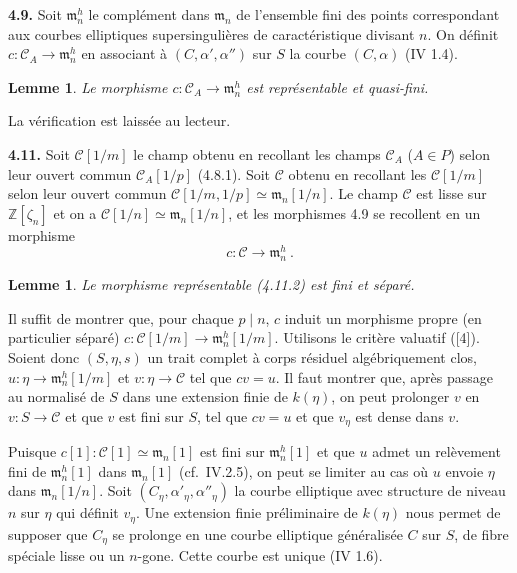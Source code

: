 \documentclass[10pt,a4paper]{amsart}
\theoremstyle{plain}
\newtheorem{lemma}[theorem]{Lemme}
\theoremstyle{definition}
\newcommand{\m}{\mathfrak{m}}
\newcommand{\cC}{\mathcal{C}}
\newcommand{\ZZ}{\mathbb{Z}}
\begin{document}
\medskip\noindent\textbf{4.9.} Soit $\m_n^h$ le compl\'ement dans $\m_n$ de l'ensemble fini des points correspondant aux courbes elliptiques supersinguli\`eres de caract\'eristique divisant $n$. On d\'efinit $c : \cC_A \to \m_n^h$ en associant \`a $(C, \alpha', \alpha'')$ sur $S$ la courbe $(C, \alpha)$ (IV 1.4).

\setcounter{theorem}{9}
\begin{lemma}
Le morphisme $c : \cC_A \to \m_n^h$ est repr\'esentable et quasi-fini.
\end{lemma}

La v\'erification est laiss\'ee au lecteur.

\medskip\noindent\textbf{4.11.} Soit $\cC[1/m]$ le champ obtenu en recollant les champs $\cC_A$ ($A \in P$) selon leur ouvert commun $\cC_A[1/p]$ (4.8.1). Soit $\cC$ obtenu en recollant les $\cC[1/m]$ selon leur ouvert commun $\cC[1/m, 1/p] \simeq \m_n[1/n]$. Le champ $\cC$ est lisse sur $\ZZ[\zeta_n]$ et on a $\cC[1/n] \simeq \m_n[1/n]$, et les morphismes 4.9 se recollent en un morphisme
\begin{equation}
c : \cC \to \m_n^h\ .
\end{equation}

\setcounter{theorem}{2}
\begin{lemma}
Le morphisme repr\'esentable (4.11.2) est fini et s\'epar\'e.
\end{lemma}

Il suffit de montrer que, pour chaque $p \mid n$, $c$ induit un morphisme propre (en particulier s\'epar\'e) $c : \cC[1/m] \to \m_n^h[1/m]$. Utilisons le crit\`ere valuatif ([4]). Soient donc $(S, \eta, s)$ un trait complet \`a corps r\'esiduel alg\'ebriquement clos, $u : \eta \to \m_n^h[1/m]$ et $v : \eta \to \cC$ tel que $cv = u$. Il faut montrer que, apr\`es passage au normalis\'e de $S$ dans une extension finie de $k(\eta)$, on peut prolonger $v$ en $v : S \to \cC$ et que $v$ est fini sur $S$, tel que $cv = u$ et que $v_\eta$ est dense dans $v$.

Puisque $c[1] : \cC[1] \simeq \m_n[1]$ est fini sur $\m_n^h[1]$ et que $u$ admet un rel\`evement fini de $\m_n^h[1]$ dans $\m_n[1]$ (cf.\ IV.2.5), on peut se limiter au cas o\`u $u$ envoie $\eta$ dans $\m_n[1/n]$. Soit $(C_\eta, \alpha'_\eta, \alpha''_\eta)$ la courbe elliptique avec structure de niveau $n$ sur $\eta$ qui d\'efinit $v_\eta$. Une extension finie pr\'eliminaire de $k(\eta)$ nous permet de supposer que $C_\eta$ se prolonge en une courbe elliptique g\'en\'eralis\'ee $C$ sur $S$, de fibre sp\'eciale lisse ou un $n$-gone. Cette courbe est unique (IV 1.6).
\end{document}
